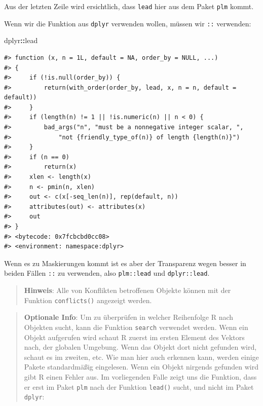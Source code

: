\documentclass[]{book}
\newenvironment{Shaded}{\begin{snugshade}}{\end{snugshade}}
\newcommand{\OperatorTok}[1]{\textcolor[rgb]{0.81,0.36,0.00}{\textbf{#1}}}
\newcommand{\NormalTok}[1]{#1}
\begin{document}
Aus der letzten Zeile wird ersichtlich, dass \texttt{lead} hier aus dem
Paket \texttt{plm} kommt.

Wenn wir die Funktion aus \texttt{dplyr} verwenden wollen, müssen wir
\texttt{::} verwenden:

\begin{Shaded}
\begin{Highlighting}[]
\NormalTok{dplyr}\OperatorTok{::}\NormalTok{lead}
\end{Highlighting}
\end{Shaded}

\begin{verbatim}
#> function (x, n = 1L, default = NA, order_by = NULL, ...) 
#> {
#>     if (!is.null(order_by)) {
#>         return(with_order(order_by, lead, x, n = n, default = default))
#>     }
#>     if (length(n) != 1 || !is.numeric(n) || n < 0) {
#>         bad_args("n", "must be a nonnegative integer scalar, ", 
#>             "not {friendly_type_of(n)} of length {length(n)}")
#>     }
#>     if (n == 0) 
#>         return(x)
#>     xlen <- length(x)
#>     n <- pmin(n, xlen)
#>     out <- c(x[-seq_len(n)], rep(default, n))
#>     attributes(out) <- attributes(x)
#>     out
#> }
#> <bytecode: 0x7fcbcbd0cc08>
#> <environment: namespace:dplyr>
\end{verbatim}

Wenn es zu Maskierungen kommt ist es aber der Transparenz wegen besser
in beiden Fällen \texttt{::} zu verwenden, also \texttt{plm::lead} und
\texttt{dplyr::lead}.

\begin{quote}
\textbf{Hinweis}: Alle von Konflikten betroffenen Objekte können mit der
Funktion \texttt{conflicts()} angezeigt werden.
\end{quote}

\begin{quote}
\textbf{Optionale Info}: Um zu überprüfen in welcher Reihenfolge R nach
Objekten sucht, kann die Funktion \texttt{search} verwendet werden. Wenn
ein Objekt aufgerufen wird schaut R zuerst im ersten Element des Vektors
nach, der globalen Umgebung. Wenn das Objekt dort nicht gefunden wird,
schaut es im zweiten, etc. Wie man hier auch erkennen kann, werden
einige Pakete standardmäßig eingelesen. Wenn ein Objekt nirgends
gefunden wird gibt R einen Fehler aus. Im vorliegenden Falle zeigt uns
die Funktion, dass er erst im Paket \texttt{plm} nach der Funktion
\texttt{lead()} sucht, und nicht im Paket \texttt{dplyr}:
\end{quote}
\end{document}
